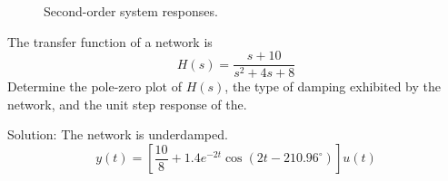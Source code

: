 \begin{frame}
    \begin{center}
        
    \end{center}
\end{frame}

\begin{frame}
    \begin{center}
        
    \end{center}
\end{frame}



\begin{frame}[plain,t]
    {
    \begin{figure}
      \centering
      
      \caption{Second-order system responses.}\label{fi:second_order_response}
    \end{figure}
    }
\end{frame}

\begin{frame}
    \begin{example}
        The transfer function of a network is
        \begin{equation*}
            H(s) = \frac{s+10}{s^2+4s+8}
        \end{equation*}
        Determine the pole-zero plot of $H(s)$, the type of damping exhibited by the network, and the unit step response of the.
    \end{example}
    \pause
    {
        Solution: The network is underdamped.\\
        \pause
        \begin{equation*}
          y(t) = \left[\frac{10}{8}+1.4e^{-2t}\cos(2t-210.96^\circ)\right]u(t)
        \end{equation*}
    }
\end{frame}

